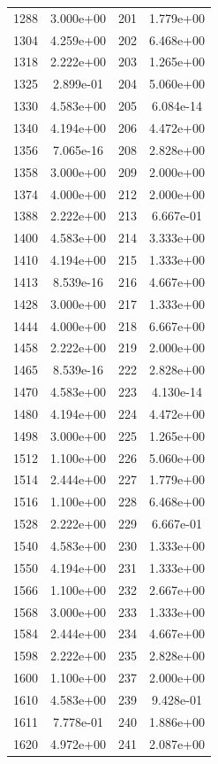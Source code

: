 \documentclass[12pt]{article}
\begin{document}
\begin{longtable}{@{}cccc@{}}
1288 & 3.000e+00 & 201 & 1.779e+00 \\
1304 & 4.259e+00 & 202 & 6.468e+00 \\
1318 & 2.222e+00 & 203 & 1.265e+00 \\
1325 & 2.899e-01 & 204 & 5.060e+00 \\
1330 & 4.583e+00 & 205 & 6.084e-14 \\
1340 & 4.194e+00 & 206 & 4.472e+00 \\
1356 & 7.065e-16 & 208 & 2.828e+00 \\
1358 & 3.000e+00 & 209 & 2.000e+00 \\
1374 & 4.000e+00 & 212 & 2.000e+00 \\
1388 & 2.222e+00 & 213 & 6.667e-01 \\
1400 & 4.583e+00 & 214 & 3.333e+00 \\
1410 & 4.194e+00 & 215 & 1.333e+00 \\
1413 & 8.539e-16 & 216 & 4.667e+00 \\
1428 & 3.000e+00 & 217 & 1.333e+00 \\
1444 & 4.000e+00 & 218 & 6.667e+00 \\
1458 & 2.222e+00 & 219 & 2.000e+00 \\
1465 & 8.539e-16 & 222 & 2.828e+00 \\
1470 & 4.583e+00 & 223 & 4.130e-14 \\
1480 & 4.194e+00 & 224 & 4.472e+00 \\
1498 & 3.000e+00 & 225 & 1.265e+00 \\
1512 & 1.100e+00 & 226 & 5.060e+00 \\
1514 & 2.444e+00 & 227 & 1.779e+00 \\
1516 & 1.100e+00 & 228 & 6.468e+00 \\
1528 & 2.222e+00 & 229 & 6.667e-01 \\
1540 & 4.583e+00 & 230 & 1.333e+00 \\
1550 & 4.194e+00 & 231 & 1.333e+00 \\
1566 & 1.100e+00 & 232 & 2.667e+00 \\
1568 & 3.000e+00 & 233 & 1.333e+00 \\
1584 & 2.444e+00 & 234 & 4.667e+00 \\
1598 & 2.222e+00 & 235 & 2.828e+00 \\
1600 & 1.100e+00 & 237 & 2.000e+00 \\
1610 & 4.583e+00 & 239 & 9.428e-01 \\
1611 & 7.778e-01 & 240 & 1.886e+00 \\
1620 & 4.972e+00 & 241 & 2.087e+00 \\

\end{longtable}
\end{document}
